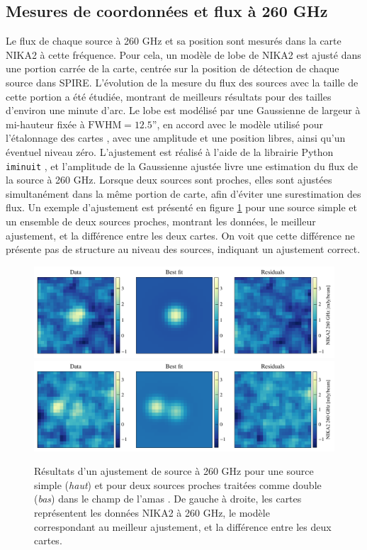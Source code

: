\subsection{Mesures de coordonnées et flux à 260 GHz}

Le flux de chaque source à 260 GHz et sa position sont mesurés dans la carte NIKA2 à cette fréquence.
Pour cela, un modèle de lobe de NIKA2 est ajusté dans une portion carrée de la carte, centrée sur la position de détection de chaque source dans SPIRE.
L'évolution de la mesure du flux des sources avec la taille de cette portion a été étudiée, montrant de meilleurs résultats pour des tailles d'environ une minute d'arc.
Le lobe est modélisé par une Gaussienne de largeur à mi-hauteur fixée à $\mathrm{FWHM} = 12.5$'', en accord avec le modèle utilisé pour l'étalonnage des cartes \cite{perotto_calibration_2020}, avec une amplitude et une position libres, ainsi qu'un éventuel niveau zéro.
L'ajustement est réalisé à l'aide de la librairie Python \texttt{iminuit} \cite{hans_dembinski_scikit-hepiminuit_2020}, et l'amplitude de la Gaussienne ajustée livre une estimation du flux de la source à 260 GHz.
Lorsque deux sources sont proches, elles sont ajustées simultanément dans la même portion de carte, afin d'éviter une surestimation des flux.
Un exemple d'ajustement est présenté en figure \ref{fig:pstools_1mm} pour une source simple et un ensemble de deux sources proches, montrant les données, le meilleur ajustement, et la différence entre les deux cartes.
On voit que cette différence ne présente pas de structure au niveau des sources, indiquant un ajustement correct.

\begin{figure}[t]
    \centering
    \includegraphics[width=.7\linewidth]{Figures/Chap_decor/4_1mm_fit.pdf}
    \includegraphics[width=.7\linewidth]{Figures/Chap_decor/2_1mm_fit.pdf}
    \caption{
        Résultats d'un ajustement de source à 260 GHz pour une source simple (\textit{haut}) et pour deux sources proches traitées comme double (\textit{bas}) dans le champ de l'amas \act.
        De gauche à droite, les cartes représentent les données NIKA2 à 260 GHz, le modèle correspondant au meilleur ajustement, et la différence entre les deux cartes.
    }
    \label{fig:pstools_1mm}
\end{figure}

